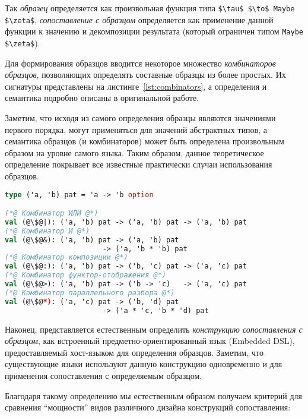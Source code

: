 Так \textit{образец} определяется как произвольная функция типа \linebreak \lstinline|$\tau$ $\to$ Maybe $\zeta$|, \textit{сопоставление с образцом} определяется как применение данной функции к значению и декомпозиции результата (который ограничен типом \lstinline|Maybe $\zeta$|). 

Для формирования образцов вводится некоторое множество \textit{комбинаторов образцов}, позволяющих определять составные образцы из более простых. Их сигнатуры представлены на листинге~\ref{lst:combinators}, а определения и семантика подробно описаны в оригинальной работе.

Заметим, что исходя из самого определения образцы являются значениями первого порядка, могут применяться для значений абстрактных типов, а семантика образцов (и комбинаторов) может быть определена произвольным образом на уровне самого языка. Таким образом, данное теоретическое определение покрывает все известные практически случаи использования образцов.

\noindent
\begin{minipage}{\linewidth}
\begin{lstlisting}[language=ocaml,escapechar=@,label={lst:combinators},caption={Типы комбинаторов образцов в \ocaml},captionpos=b]
type ('a, 'b) pat = 'a -> 'b option

(*@ Комбинатор ИЛИ @*)
val (@\$@|): ('a, 'b) pat -> ('a, 'b) pat -> ('a, 'b) pat
(*@ Комбинатор И @*)
val (@\$@&): ('a, 'b) pat -> ('a, 'b) pat 
                       -> ('a, 'b * 'b) pat
(*@ Комбинатор композиции @*)
val (@\$@:): ('a, 'b) pat -> ('b, 'c) pat -> ('a, 'c) pat
(*@ Комбинатор функтор-отображения @*)
val (@\$@>): ('a, 'b) pat -> ('b -> 'c)   -> ('a, 'c) pat
(*@ Комбинатор параллельного разбора @*)
val (@\$@*): ('a, 'c) pat -> ('b, 'd) pat 
                       -> ('a * 'c, 'b * 'd) pat
\end{lstlisting}
\end{minipage}

Наконец, представляется естественным определить \textit{конструкцию сопоставления с образцом}, как встроенный предметно-ориентированный язык (Embedded DSL), предоставляемый хост-языком для определения образцов. Заметим, что существующие языки используют данную конструкцию одновременно и для применения сопоставления с определяемым образцом. 

Благодаря такому определению мы естественным образом получаем критерий для сравнения ``мощности'' видов различного дизайна конструкций сопоставления:

